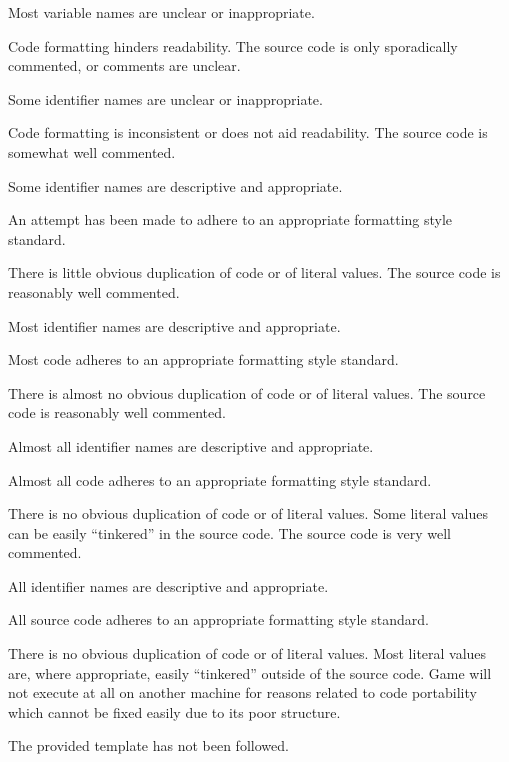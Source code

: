\documentclass{../fal_assignment}
\begin{document}
\begin{markingrubric}
            \par Most variable names are unclear or inappropriate.
            \par Code formatting hinders readability.
        \grade The source code is only sporadically commented, or comments are unclear.
            \par Some identifier names are unclear or inappropriate.
            \par Code formatting is inconsistent or does not aid readability.
        \grade The source code is somewhat well commented.
            \par Some identifier names are descriptive and appropriate.
            \par An attempt has been made to adhere to an appropriate formatting style standard.
             \par There is little obvious duplication of code or of literal values.           
        \grade The source code is reasonably well commented.
            \par Most identifier names are descriptive and appropriate.
            \par Most code adheres to an appropriate formatting style standard.
             \par There is almost no obvious duplication of code or of literal values.   
        \grade The source code is reasonably well commented.
            \par Almost all identifier names are descriptive and appropriate.
            \par Almost all code adheres to an appropriate formatting style standard.
             \par There is no obvious duplication of code or of literal values. Some literal values can be easily ``tinkered'' in the source code. 
        \grade The source code is very well commented.
            \par All identifier names are descriptive and appropriate.
            \par All source code adheres to an appropriate formatting style standard.
             \par There is no obvious duplication of code or of literal values. Most literal values are, where appropriate, easily ``tinkered'' outside of the source code.  
%
        \grade\fail Game will not execute at all on another machine for reasons related to code portability which cannot be fixed easily due to its poor structure.
            \par The provided template has not been followed.

\end{markingrubric}
\end{document}
